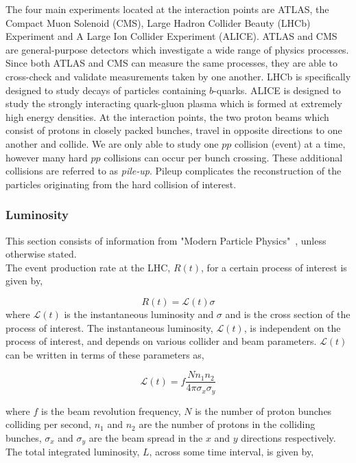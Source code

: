 The four main experiments located at the interaction points are ATLAS, the Compact Muon Solenoid (CMS), Large Hadron Collider Beauty (LHCb) Experiment and A Large Ion Collider Experiment (ALICE). ATLAS and CMS are general-purpose detectors which investigate a wide range of physics processes. Since both ATLAS and CMS can measure the same processes, they are able to cross-check and validate measurements taken by one another. LHCb is specifically designed to study decays of particles containing $b$-quarks. ALICE is designed to study the strongly interacting quark-gluon plasma which is formed at extremely high energy densities. At the interaction points, the two proton beams which consist of protons in closely packed bunches, travel in opposite directions to one another and collide. We are only able to study one $pp$ collision (event) at a time, however many hard $pp$ collisions can occur per bunch crossing. These additional collisions are referred to as \textit{pile-up}. Pileup complicates the reconstruction of the particles originating from the hard collision of interest. 

\subsubsection{Luminosity}
This section consists of information from "Modern Particle Physics"~\cite{thomson2013modern}, unless otherwise stated.\\

The event production rate at the LHC, $R(t)$, for a certain process of interest is given by, 

\begin{equation}
R(t) = \mathcal{L}(t)\sigma
\end{equation}
where $\mathcal{L}(t)$ is the instantaneous luminosity and $\sigma$ and is the cross section of the process of interest. The instantaneous luminosity, $\mathcal{L}(t)$, is independent on the process of interest, and depends on various collider and beam parameters. $\mathcal{L}(t)$ can be written in terms of these parameters as,

\begin{equation}
\mathcal{L}(t) = f \frac{N n_{1} n_{2}}{4\pi \sigma_{x} \sigma_{y}}
\end{equation}

where $f$ is the beam revolution frequency, $N$ is the number of proton bunches colliding per second, $n_{1}$ and $n_{2}$ are the number of protons in the colliding bunches, $\sigma_{x}$ and $\sigma_{y}$ are the beam spread in the $x$ and $y$ directions respectively. The total integrated luminosity, $L$, across some time interval, is given by,

